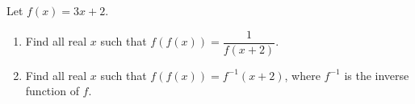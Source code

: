 Let $f(x)=3x+2$.
\begin{enumerate}
\item[(a)] Find all real $x$ such that $f(f(x))=\dfrac{1}{f(x+2)}$.
\item[(b)] Find all real $x$ such that $f(f(x))=f^{-1}(x+2)$, where $f^{-1}$ is the inverse function of $f$.
\end{enumerate}
